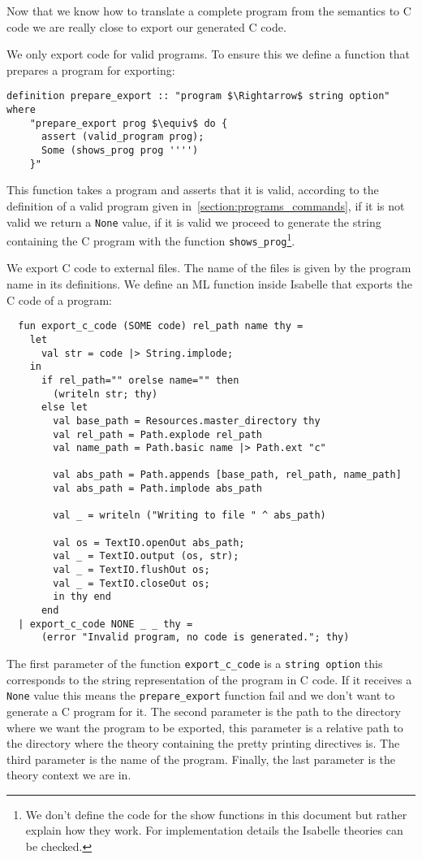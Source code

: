 Now that we know how to translate a complete program from the semantics to C code we are really close to export our generated C code.

We only export code for valid programs.
To ensure this we define a function that prepares a program for exporting:

\begin{lstlisting}[mathescape=true]
  definition prepare_export :: "program $\Rightarrow$ string option" where
    "prepare_export prog $\equiv$ do {
      assert (valid_program prog);
      Some (shows_prog prog '''')
    }"
\end{lstlisting}


This function takes a program and asserts that it is valid, according to the definition of a valid program given in~\ref{section:programs_commands}, if it is not valid we return a \verb|None| value, if it is valid we proceed to generate the string containing the C program with the function \verb|shows_prog|\footnote{We don't define the code for the show functions in this document but rather explain how they work. For implementation details the Isabelle theories can be checked.}.

We export C code to external files.
The name of the files is given by the program name in its definitions.
We define an ML function inside Isabelle that exports the C code of a program:


\begin{lstlisting}
  fun export_c_code (SOME code) rel_path name thy =
    let
      val str = code |> String.implode;
    in
      if rel_path="" orelse name="" then
        (writeln str; thy)
      else let
        val base_path = Resources.master_directory thy
        val rel_path = Path.explode rel_path
        val name_path = Path.basic name |> Path.ext "c"

        val abs_path = Path.appends [base_path, rel_path, name_path]
        val abs_path = Path.implode abs_path

        val _ = writeln ("Writing to file " ^ abs_path)

        val os = TextIO.openOut abs_path;
        val _ = TextIO.output (os, str);
        val _ = TextIO.flushOut os;
        val _ = TextIO.closeOut os;
        in thy end
      end
  | export_c_code NONE _ _ thy =
      (error "Invalid program, no code is generated."; thy)
\end{lstlisting}

The first parameter of the function \verb|export_c_code| is a \verb|string option| this corresponds to the string representation of the program in C code.
If it receives a \verb|None| value this means the \verb|prepare_export| function fail and we don't want to generate a C program for it.
The second parameter is the path to the directory where we want the program to be exported, this parameter is a relative path to the directory where the theory containing the pretty printing directives is.
The third parameter is the name of the program.
Finally, the last parameter is the theory context we are in.

